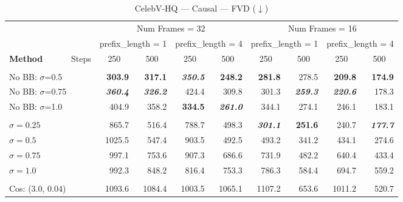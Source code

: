 \begin{table}[htbp]
\centering\footnotesize
\caption{CelebV-HQ --- Causal --- FVD ($\downarrow$)}
\label{tab:celebvhq_causal_CAUSAL_EVAL_fvd}
\begin{tabular}{lrrrrrrrr}
\toprule
 & \multicolumn{4}{c}{Num Frames = 32} & \multicolumn{4}{c}{Num Frames = 16} \\
\cmidrule(lr){2-5} \cmidrule(lr){6-9}
 & \multicolumn{2}{c}{prefix\_length = 1} & \multicolumn{2}{c}{prefix\_length = 4} & \multicolumn{2}{c}{prefix\_length = 1} & \multicolumn{2}{c}{prefix\_length = 4} \\
\cmidrule(lr){2-3} \cmidrule(lr){4-5} \cmidrule(lr){6-7} \cmidrule(lr){8-9}
\textbf{Method} \ \ \ \ \ \ Steps & \multicolumn{1}{c}{250} & \multicolumn{1}{c}{500} & \multicolumn{1}{c}{250} & \multicolumn{1}{c}{500} & \multicolumn{1}{c}{250} & \multicolumn{1}{c}{500} & \multicolumn{1}{c}{250} & \multicolumn{1}{c}{500} \\
\midrule
\rowcolor{gray!20} \multicolumn{9}{l}{\textit{ABC}} \\
\quad No BB: $\sigma$=0.5 & \textbf{303.9} & \textbf{317.1} & \textbf{\textit{350.5}} & \textbf{248.2} & \textbf{281.8} & 278.5 & \textbf{209.8} & \textbf{174.9} \\
\quad No BB: $\sigma$=0.75 & \textbf{\textit{360.4}} & \textbf{\textit{326.2}} & 424.4 & 309.8 & 301.3 & \textbf{\textit{259.3}} & \textbf{\textit{220.6}} & 178.3 \\
\quad No BB: $\sigma$=1.0 & 404.9 & 358.2 & \textbf{334.5} & \textbf{\textit{261.0}} & 344.1 & 274.1 & 246.1 & 183.1 \\
\rowcolor{gray!20} \multicolumn{9}{l}{\textit{Conditional Diffusion Bridge}} \\
\quad $\sigma=0.25$ & 865.7 & 516.4 & 788.7 & 498.3 & \textbf{\textit{301.1}} & \textbf{251.6} & 240.7 & \textbf{\textit{177.7}} \\
\quad $\sigma=0.5$ & 1025.5 & 547.4 & 903.5 & 492.5 & 493.2 & 341.2 & 434.1 & 274.6 \\
\quad $\sigma=0.75$ & 997.1 & 753.6 & 907.3 & 686.6 & 731.9 & 482.2 & 640.4 & 433.4 \\
\quad $\sigma=1.0$ & 992.3 & 848.2 & 816.4 & 753.3 & 786.3 & 584.4 & 694.7 & 559.2 \\
\rowcolor{gray!20} \multicolumn{9}{l}{\textit{Noise-to-Data Diffusion}} \\
\quad Cos: (3.0, 0.04) & 1093.6 & 1084.4 & 1003.5 & 1065.1 & 1107.2 & 653.6 & 1011.2 & 520.7 \\
\bottomrule
\end{tabular}
\end{table}

